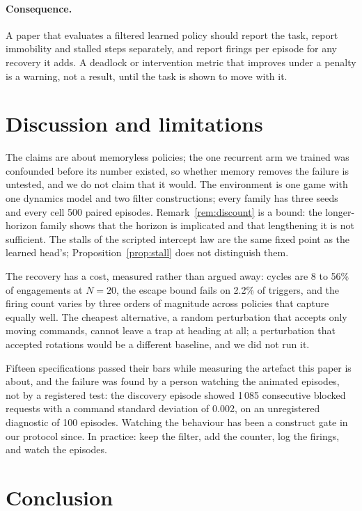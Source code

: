\documentclass{l4dc2027}
\begin{document}
\paragraph{Consequence.} A paper that evaluates a filtered learned policy should report the task, report immobility and stalled steps separately, and report firings per episode for any recovery it adds. A deadlock or intervention metric that improves under a penalty is a warning, not a result, until the task is shown to move with it.

\section{Discussion and limitations}\label{sec:discussion}

The claims are about memoryless policies; the one recurrent arm we trained was confounded before its number existed, so whether memory removes the failure is untested, and we do not claim that it would. The environment is one game with one dynamics model and two filter constructions; every family has three seeds and every cell 500 paired episodes. Remark~\ref{rem:discount} is a bound: the longer-horizon family shows that the horizon is implicated and that lengthening it is not sufficient. The stalls of the scripted intercept law are the same fixed point as the learned head's; Proposition~\ref{prop:stall} does not distinguish them.

The recovery has a cost, measured rather than argued away: cycles are 8 to 56\% of engagements at $N = 20$, the escape bound fails on 2.2\% of triggers, and the firing count varies by three orders of magnitude across policies that capture equally well. The cheapest alternative, a random perturbation that accepts only moving commands, cannot leave a trap at heading at all; a perturbation that accepted rotations would be a different baseline, and we did not run it.

Fifteen specifications passed their bars while measuring the artefact this paper is about, and the failure was found by a person watching the animated episodes, not by a registered test: the discovery episode showed 1\,085 consecutive blocked requests with a command standard deviation of 0.002, on an unregistered diagnostic of 100 episodes. Watching the behaviour has been a construct gate in our protocol since. In practice: keep the filter, add the counter, log the firings, and watch the episodes.

\section{Conclusion}\label{sec:conclusion}
\end{document}
